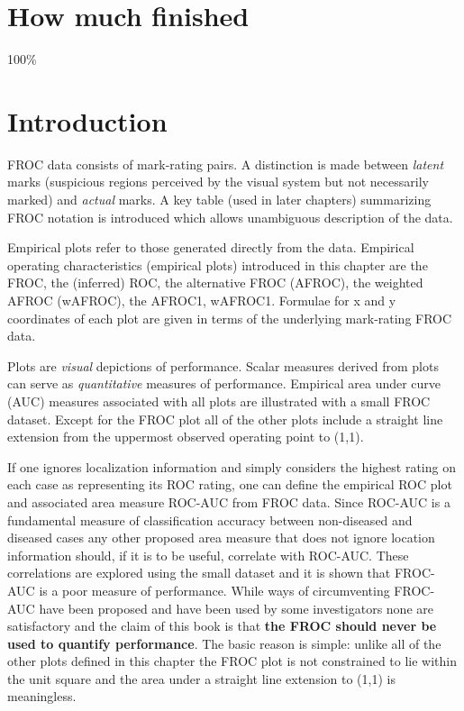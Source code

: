 \documentclass[
]{book}
\begin{document}
\hypertarget{empirical-how-much-finished}{%
\section{How much finished}\label{empirical-how-much-finished}}

100\%

\hypertarget{empirical-intro}{%
\section{Introduction}\label{empirical-intro}}

FROC data consists of mark-rating pairs. A distinction is made between \emph{latent} marks (suspicious regions perceived by the visual system but not necessarily marked) and \emph{actual} marks. A key table (used in later chapters) summarizing FROC notation is introduced which allows unambiguous description of the data.

Empirical plots refer to those generated directly from the data. Empirical operating characteristics (empirical plots) introduced in this chapter are the FROC, the (inferred) ROC, the alternative FROC (AFROC), the weighted AFROC (wAFROC), the AFROC1, wAFROC1. Formulae for x and y coordinates of each plot are given in terms of the underlying mark-rating FROC data.

Plots are \emph{visual} depictions of performance. Scalar measures derived from plots can serve as \emph{quantitative} measures of performance. Empirical area under curve (AUC) measures associated with all plots are illustrated with a small FROC dataset. Except for the FROC plot all of the other plots include a straight line extension from the uppermost observed operating point to (1,1).

If one ignores localization information and simply considers the highest rating on each case as representing its ROC rating, one can define the empirical ROC plot and associated area measure ROC-AUC from FROC data. Since ROC-AUC is a fundamental measure of classification accuracy between non-diseased and diseased cases any other proposed area measure that does not ignore location information should, if it is to be useful, correlate with ROC-AUC. These correlations are explored using the small dataset and it is shown that FROC-AUC is a poor measure of performance. While ways of circumventing FROC-AUC have been proposed and have been used by some investigators none are satisfactory and the claim of this book is that \textbf{the FROC should never be used to quantify performance}. The basic reason is simple: unlike all of the other plots defined in this chapter the FROC plot is not constrained to lie within the unit square and the area under a straight line extension to (1,1) is meaningless.
\end{document}

